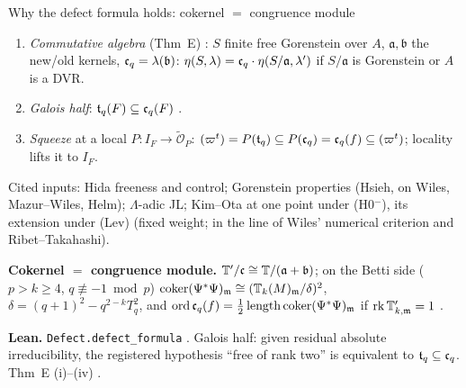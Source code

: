 \begin{frame}{Why the defect formula holds: cokernel $=$ congruence module}
  \small
  \begin{enumerate}\setlength{\itemsep}{1pt}
    \item \emph{Commutative algebra} (Thm~E) : $S$ finite free Gorenstein over $A$, $\mathfrak a,\mathfrak b$ the new/old kernels,
      $\mathfrak c_q=\lambda(\mathfrak b)$: $\eta(S,\lambda)=\mathfrak c_q\cdot\eta(S/\mathfrak a,\lambda')$ if $S/\mathfrak a$ is Gorenstein or $A$ is a DVR.
    \item \emph{Galois half}: $\mathfrak t_q(F)\subseteq\mathfrak c_q(F)$ .
    \item \emph{Squeeze} at a local $P:I_F\to\widetilde{\mathcal O}_P$: $(\varpi^t)=P(\mathfrak t_q)\subseteq P(\mathfrak c_q)=\mathfrak c_q(f)\subseteq(\varpi^t)$; locality lifts it to $I_F$.
  \end{enumerate}
  {\footnotesize Cited inputs: Hida freeness and control; Gorenstein properties (Hsieh, on Wiles, Mazur--Wiles, Helm); $\Lambda$-adic JL;
  Kim--Ota at one point under (H0$^-$), its extension under (Lev) (fixed weight; in the line of Wiles' numerical criterion and Ribet--Takahashi).}

  \smallskip
  \textbf{Cokernel $=$ congruence module.} $\mathbb T'/\mathfrak c\cong\mathbb T/(\mathfrak a+\mathfrak b)$; on the Betti side ($p>k\ge4$, $q\not\equiv-1\bmod p$)
  $\operatorname{coker}(\Psi^*\Psi)_\mathfrak m\cong(\mathbb T_k(M)_\mathfrak m/\delta)^{2}$, $\delta=(q+1)^2-q^{2-k}T_q^2$, and
  $\operatorname{ord}\mathfrak c_q(f)=\tfrac12\operatorname{length}\operatorname{coker}(\Psi^*\Psi)_\mathfrak m$ if $\operatorname{rk}\mathbb T'_{k,\mathfrak m}=1$
  .

  {\footnotesize\textbf{Lean.} \texttt{Defect.defect\_formula} .
  Galois half: given residual absolute irreducibility, the registered hypothesis ``free of rank two'' is equivalent to $\mathfrak t_q\subseteq\mathfrak c_q$.
  Thm~E (i)--(iv) .}
\end{frame}
